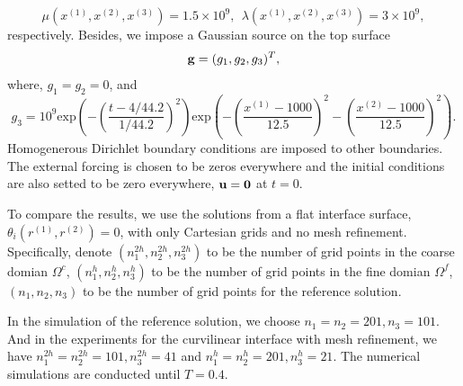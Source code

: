 \begin{equation}
\mu(x^{(1)},x^{(2)},x^{(3)}) = 1.5\times 10^9,\ \ 
\lambda(x^{(1)},x^{(2)},x^{(3)})  = 3\times 10^9,
\end{equation}
respectively. Besides, we impose a Gaussian source on the top surface
\[{\bf g} = (g_1,g_2,g_3)^T ,\]
where, $g_1 = g_2 = 0$, and 
\[g_3 = 10^9 \text{exp}\left(-\left(\frac{t-4/44.2}{1/44.2}\right)^2\right)\text{exp}\left(-\left(\frac{x^{(1)}-1000}{12.5}\right)^2-\left(\frac{x^{(2)}-1000}{12.5}\right)^2\right).\]
Homogenerous Dirichlet boundary conditions are imposed to other boundaries. The external forcing is chosen to be zeros everywhere and the initial conditions are also setted to be zero everywhere, ${\bf u} = {\bf 0}$ at $t = 0$.

To compare the results, we use the solutions from a flat interface surface, $\theta_i(r^{(1)},r^{(2)}) = 0$, with only Cartesian grids and no mesh refinement. Specifically, denote $(n_1^{2h},n_2^{2h},n_3^{2h})$ to be the number of grid points in the coarse domian $\Omega^c$, $(n_1^h,n_2^h,n_3^h)$ to be the number of grid points in the fine domian $\Omega^f$, $(n_1,n_2,n_3)$ to be the number of grid points for the reference solution.

In the simulation of the reference solution, we choose $n_1 = n_2 = 201, n_3 = 101$. And in the experiments for the curvilinear interface with mesh refinement, we have $n_1^{2h} = n_2^{2h} = 101, n_3^{2h} = 41$ and $n_1^h = n_2^h = 201, n_3^h = 21$. The numerical simulations are conducted until $T = 0.4$.

